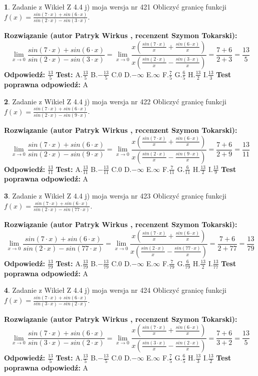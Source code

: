 \documentclass[12pt, a4paper]{article}
\theoremstyle{definition} %
\newtheorem{zad}{}
\newcommand{\zadStart}[1]{\begin{zad}#1\newline}
\newcommand{\zadStop}{\end{zad}}
\newcommand{\rozwStart}[2]{\noindent \textbf{Rozwiązanie (autor #1 , recenzent #2): }\newline}
\newcommand{\rozwStop}{\newline}
\newcommand{\odpStart}{\noindent \textbf{Odpowiedź:}\newline}
\newcommand{\odpStop}{\newline}
\newcommand{\testStart}{\noindent \textbf{Test:}\newline}
\newcommand{\testStop}{\newline}
\newcommand{\kluczStart}{\noindent \textbf{Test poprawna odpowiedź:}\newline}
\newcommand{\kluczStop}{\newline}
\begin{document}
\zadStart{Zadanie z Wikieł Z 4.4 j) moja wersja nr 421}
Obliczyć granicę funkcji $f(x)=\frac{sin(7\cdot x) +sin(6\cdot x)}{sin(2\cdot x) -sin(3\cdot x)}$.
\zadStop
\rozwStart{Patryk Wirkus}{Szymon Tokarski}
$$\lim\limits_{x\to 0}\frac{sin(7\cdot x) +sin(6\cdot x)}{sin(2\cdot x) -sin(3\cdot x)}=\lim\limits_{x\to 0}\frac{x(\frac{sin(7\cdot x)}{x}+\frac{sin(6\cdot x)}{x})}{x(\frac{sin(2\cdot x)}{x}-\frac{sin(3\cdot x)}{x})}=\frac{7+6}{2+3} = \frac{13}{5}$$
\rozwStop
\odpStart
$\frac{13}{5}$
\odpStop
\testStart
A.$\frac{13}{5}$
B.$-\frac{13}{5}$
C.$0$
D.$-\infty$
E.$\infty$
F.$\frac{7}{5}$
G.$\frac{6}{5}$
H.$\frac{13}{2}$
I.$\frac{13}{3}$
\testStop
\kluczStart
A
\kluczStop



\zadStart{Zadanie z Wikieł Z 4.4 j) moja wersja nr 422}
Obliczyć granicę funkcji $f(x)=\frac{sin(7\cdot x) +sin(6\cdot x)}{sin(2\cdot x) -sin(9\cdot x)}$.
\zadStop
\rozwStart{Patryk Wirkus}{Szymon Tokarski}
$$\lim\limits_{x\to 0}\frac{sin(7\cdot x) +sin(6\cdot x)}{sin(2\cdot x) -sin(9\cdot x)}=\lim\limits_{x\to 0}\frac{x(\frac{sin(7\cdot x)}{x}+\frac{sin(6\cdot x)}{x})}{x(\frac{sin(2\cdot x)}{x}-\frac{sin(9\cdot x)}{x})}=\frac{7+6}{2+9} = \frac{13}{11}$$
\rozwStop
\odpStart
$\frac{13}{11}$
\odpStop
\testStart
A.$\frac{13}{11}$
B.$-\frac{13}{11}$
C.$0$
D.$-\infty$
E.$\infty$
F.$\frac{7}{11}$
G.$\frac{6}{11}$
H.$\frac{13}{2}$
I.$\frac{13}{9}$
\testStop
\kluczStart
A
\kluczStop



\zadStart{Zadanie z Wikieł Z 4.4 j) moja wersja nr 423}
Obliczyć granicę funkcji $f(x)=\frac{sin(7\cdot x) +sin(6\cdot x)}{sin(2\cdot x) -sin(77\cdot x)}$.
\zadStop
\rozwStart{Patryk Wirkus}{Szymon Tokarski}
$$\lim\limits_{x\to 0}\frac{sin(7\cdot x) +sin(6\cdot x)}{sin(2\cdot x) -sin(77\cdot x)}=\lim\limits_{x\to 0}\frac{x(\frac{sin(7\cdot x)}{x}+\frac{sin(6\cdot x)}{x})}{x(\frac{sin(2\cdot x)}{x}-\frac{sin(77\cdot x)}{x})}=\frac{7+6}{2+77} = \frac{13}{79}$$
\rozwStop
\odpStart
$\frac{13}{79}$
\odpStop
\testStart
A.$\frac{13}{79}$
B.$-\frac{13}{79}$
C.$0$
D.$-\infty$
E.$\infty$
F.$\frac{7}{79}$
G.$\frac{6}{79}$
H.$\frac{13}{2}$
I.$\frac{13}{77}$
\testStop
\kluczStart
A
\kluczStop



\zadStart{Zadanie z Wikieł Z 4.4 j) moja wersja nr 424}
Obliczyć granicę funkcji $f(x)=\frac{sin(7\cdot x) +sin(6\cdot x)}{sin(3\cdot x) -sin(2\cdot x)}$.
\zadStop
\rozwStart{Patryk Wirkus}{Szymon Tokarski}
$$\lim\limits_{x\to 0}\frac{sin(7\cdot x) +sin(6\cdot x)}{sin(3\cdot x) -sin(2\cdot x)}=\lim\limits_{x\to 0}\frac{x(\frac{sin(7\cdot x)}{x}+\frac{sin(6\cdot x)}{x})}{x(\frac{sin(3\cdot x)}{x}-\frac{sin(2\cdot x)}{x})}=\frac{7+6}{3+2} = \frac{13}{5}$$
\rozwStop
\odpStart
$\frac{13}{5}$
\odpStop
\testStart
A.$\frac{13}{5}$
B.$-\frac{13}{5}$
C.$0$
D.$-\infty$
E.$\infty$
F.$\frac{7}{5}$
G.$\frac{6}{5}$
H.$\frac{13}{3}$
I.$\frac{13}{2}$
\testStop
\kluczStart
A
\kluczStop
\end{document}
